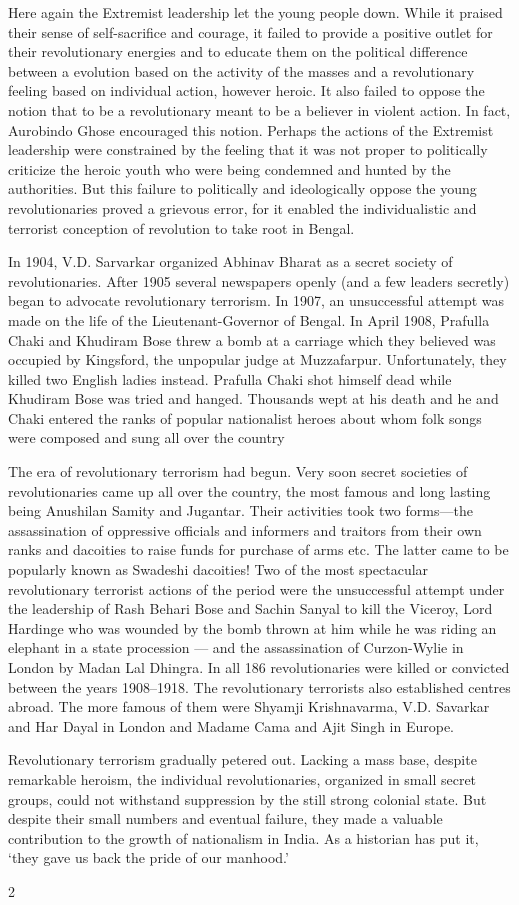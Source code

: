 \begin{multicols}{2}
Here again the Extremist leadership let the young people down. While it praised their sense of self-sacrifice and courage, it failed to provide a positive outlet for their revolutionary energies and to educate them on the political difference between a evolution based on the activity of the masses and a revolutionary feeling based on individual action, however heroic. It also failed to oppose the notion that to be a revolutionary meant to be a believer in violent action. In fact, Aurobindo Ghose encouraged this notion. Perhaps the actions of the Extremist leadership were constrained by the feeling that it was not proper to politically criticize the heroic youth who were being condemned and hunted by the authorities. But this failure to politically and ideologically oppose the young revolutionaries proved a grievous error, for it enabled the individualistic and terrorist conception of revolution to take root in Bengal.

In 1904, V.D. Sarvarkar organized Abhinav Bharat as a secret society of revolutionaries. After 1905 several newspapers openly (and a few leaders secretly) began to advocate revolutionary terrorism. In 1907, an unsuccessful attempt was made on the life of the Lieutenant-Governor of Bengal. In April 1908, Prafulla Chaki and Khudiram Bose threw a bomb at a carriage which they believed was occupied by Kingsford, the unpopular judge at Muzzafarpur. Unfortunately, they killed two English ladies instead. Prafulla Chaki shot himself dead while Khudiram Bose was tried and hanged. Thousands wept at his death and he and Chaki entered the ranks of popular nationalist heroes about whom folk songs were composed and sung all over the country

The era of revolutionary terrorism had begun. Very soon secret societies of revolutionaries came up all over the country, the most famous and long lasting being Anushilan Samity and Jugantar. Their activities took two forms---the assassination of oppressive officials and informers and traitors from their own ranks and dacoities to raise funds for purchase of arms etc. The latter came to be popularly known as Swadeshi dacoities! Two of the most spectacular revolutionary terrorist actions of the period were the unsuccessful attempt under the leadership of Rash Behari Bose and Sachin Sanyal to kill the Viceroy, Lord Hardinge who was wounded by the bomb thrown at him while he was riding an elephant in a state procession --- and the assassination of Curzon-Wylie in London by Madan Lal Dhingra. In all 186 revolutionaries were killed or convicted between the years 1908--1918. The revolutionary terrorists also established centres abroad. The more famous of them were Shyamji Krishnavarma, V.D. Savarkar and Har Dayal in London and Madame Cama and Ajit Singh in Europe.

Revolutionary terrorism gradually petered out. Lacking a mass base, despite remarkable heroism, the individual revolutionaries, organized in small secret groups, could not withstand suppression by the still strong colonial state. But despite their small numbers and eventual failure, they made a valuable contribution to the growth of nationalism in India. As a historian has put it, `they gave us back the pride of our manhood.'
\end{multicols}{2}
